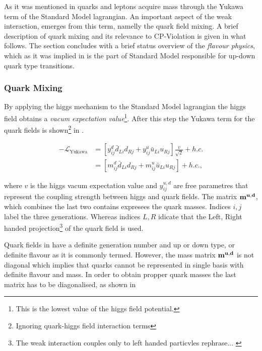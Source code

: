 As it was mentioned in  quarks and leptons acquire mass through the Yukawa term
of the Standard Model lagrangian. An important aspect of the weak interaction, emerges from this term,
namelly the quark field mixing. A brief description of quark mixing and its relevance to CP-Violation is given in what follows.
The section concludes with a brief status overview of the {\it flavour physics}, which as it was implied in 
is the part of Standard Model responsible for up-down quark type transitions.

\subsubsection{Quark Mixing}
By applying the higgs mechanism to the Standard Model lagrangian the higgs field obtains a
{\it vacum expectation value}\footnote{This is the lowest value of the higgs field potential.}.
After this step the Yukawa term for the quark fields is
shown\footnote{Ignoring quark-higgs field interaction terms} in .

\begin{align}
  -\mathscr{L}_{\text{Yukawa}} &= \left[ y_{ij}^d \bar{d}_{Li} d_{Rj} + y_{ij}^u \bar{u}_{Li} u_{Rj} \right] \frac{v}{\sqrt{2}} + h.c. \nonumber \\
                               &= \left[ m_{ij}^d \bar{d}_{Li} d_{Rj} + m_{ij}^u \bar{u}_{Li} u_{Rj} \right] + h.c.,
  \label{yukawa_flavour}
\end{align}

\noindent where $v$ is the higgs vacum expectation value and $y_{ij}^{u,d}$ are free parametres that represent the
coupling strength between higgs and quark fields. The matrix $\bf m^{u,d}$, which combines the last two contains
expresees the quark masses. Indices $i,j$ label the three generations. Whereas indices $L,R$ idicate that the Left, Right handed
projection\footnote{The weak interaction couples only to left handed particvles {\color{red} rephrase... }} of the quark field is used.

Quark fields in  have a definite generation number and up or down type, or definite flavour as it
is commonly termed. However, the mass matrix $\bf m^{u,d}$ is not diagonal which implies that quarks cannot be represented
in single basis with definite flavour and mass. In order to obtain propper quark masses the last matrix has to be diagonalised,
as shown in

